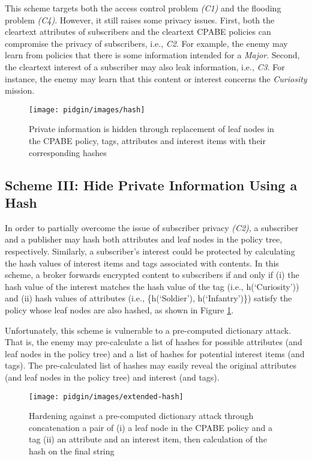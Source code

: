 \documentclass[epsfig,a4paper,11pt,titlepage]{book}
\numberwithin{algorithm}{chapter}
\begin{document}
This scheme targets both the access control problem \textit{(C1)} and the flooding problem \textit{(C4)}. However, it still raises some privacy issues. First, both the cleartext attributes of subscribers and the cleartext \gls{CPABE} policies can compromise the privacy of subscribers, i.e., \textit{C2}. For example, the enemy may learn from policies that there is some information intended for a \emph{Major}. Second, the cleartext interest of a subscriber may also leak information, i.e., \textit{C3}. For instance, the enemy may learn that this content or interest concerns the \emph{Curiosity} mission.

\begin{figure} [htp]
\centering
\texttt{[image: pidgin/images/hash]}
\caption[Hiding private information using hash functions]{Private information is hidden through replacement of leaf nodes in the \gls{CPABE} policy, tags, attributes and interest items with their corresponding hashes}
\label{fig:pidgin-hash}
\end{figure}

\subsection{Scheme III: Hide Private Information Using a Hash}
In order to partially overcome the issue of subscriber privacy \textit{(C2)}, a subscriber and a publisher may hash both attributes and leaf nodes in the policy tree, respectively. Similarly, a subscriber's interest could be protected by calculating the hash values of interest items and tags associated with contents. In this scheme, a broker forwards encrypted content to subscribers if and only if (i) the hash value of the interest matches the hash value of the tag (i.e., h(`Curiosity')) and (ii) hash values of attributes (i.e., \{h(`Soldier'), h(`Infantry')\}) satisfy the policy  whose leaf nodes are also hashed, as shown in Figure \ref{fig:pidgin-hash}.

Unfortunately, this scheme is vulnerable to a pre-computed dictionary attack. That is, the enemy may pre-calculate a list of hashes for possible attributes (and leaf nodes in the policy tree) and a list of hashes for potential interest items (and tags). The pre-calculated list of hashes may easily reveal the original attributes (and leaf nodes in the policy tree) and interest (and tags).

\begin{figure} [htp]
\centering
\texttt{[image: pidgin/images/extended-hash]}
\caption[Hardening against a pre-computed dictionary attack]{Hardening against a pre-computed dictionary attack through concatenation a pair of (i) a leaf node in the \gls{CPABE} policy and a tag (ii) an attribute and an interest item, then calculation of the hash on the final string}
\label{fig:pidgin-extended-hash}
\end{figure}
\end{document}
